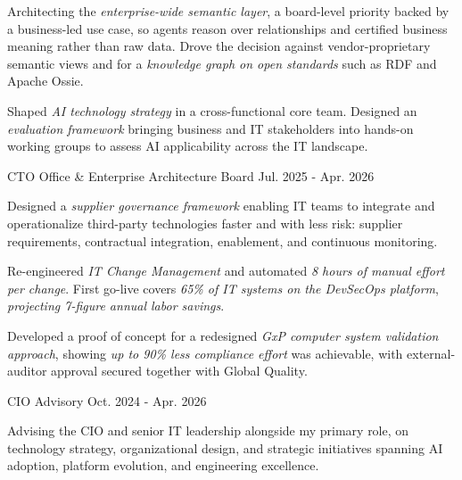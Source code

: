 \begin{cventries}
{\begin{cvitems}
        \item {Architecting the \textit{enterprise-wide semantic layer}, a board-level priority backed by a business-led use case, so agents reason over relationships and certified business meaning rather than raw data. Drove the decision against vendor-proprietary semantic views and for a \textit{knowledge graph on open standards} such as RDF and Apache Ossie.}
        \item {Shaped \textit{AI technology strategy} in a cross-functional core team. Designed an \textit{evaluation framework} bringing business and IT stakeholders into hands-on working groups to assess AI applicability across the IT landscape.}
      \end{cvitems}
    }

  \cventry
    {CTO Office \& Enterprise Architecture Board} %
    {} %
    {} %
    {Jul. 2025 - Apr. 2026} %
    {
      \begin{cvitems}
        \item {Designed a \textit{supplier governance framework} enabling IT teams to integrate and operationalize third-party technologies faster and with less risk: supplier requirements, contractual integration, enablement, and continuous monitoring.}
        \item {Re-engineered \textit{IT Change Management} and automated \textit{8 hours of manual effort per change}. First go-live covers \textit{65\% of IT systems on the DevSecOps platform}, \textit{projecting 7-figure annual labor savings}.}
        \item {Developed a proof of concept for a redesigned \textit{GxP computer system validation approach}, showing \textit{up to 90\% less compliance effort} was achievable, with external-auditor approval secured together with Global Quality.}
      \end{cvitems}
    }

  \cventry
    {CIO Advisory} %
    {} %
    {} %
    {Oct. 2024 - Apr. 2026} %
    {
      \begin{cvprose}
      Advising the CIO and senior IT leadership alongside my primary role, on technology strategy, organizational design, and strategic initiatives spanning AI adoption, platform evolution, and engineering excellence.
      \end{cvprose}
    }


\end{cventries}
